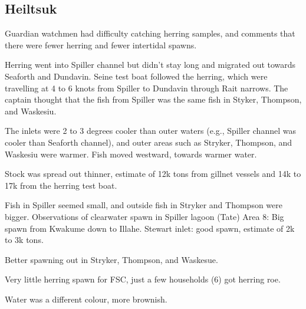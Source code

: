 \subsection{Heiltsuk}

Guardian watchmen had difficulty catching herring samples, and
comments that there were fewer herring and fewer intertidal spawns. 

Herring went into Spiller channel but
didn't stay long and migrated out towards Seaforth and Dundavin.
Seine test boat followed the herring, which were travelling at 4 to 6 knots
from Spiller to Dundavin through Rait narrows.
The captain thought that the fish from Spiller
was the same fish in Styker, Thompson, and Waskesiu.

The inlets were 2 to 3 degrees cooler than outer waters
(e.g., Spiller channel was cooler than Seaforth channel), and
outer areas such as Stryker, Thompson, and Waskesiu were warmer.
Fish moved westward, towards warmer water.

Stock was spread out thinner,
estimate of 12k tons from gillnet vessels and
14k to 17k from the herring test boat. 

Fish in Spiller seemed small, and
outside fish in Stryker and Thompson were bigger.
Observations of clearwater spawn in Spiller lagoon (Tate) 
Area 8: Big spawn from Kwakume down to Illahe.
Stewart inlet: good spawn, estimate of 2k to 3k tons.

Better spawning out in Stryker, Thompson, and Waskesue.

Very little herring spawn for FSC, just a few households (6) got herring roe.

Water was a different colour, more brownish.